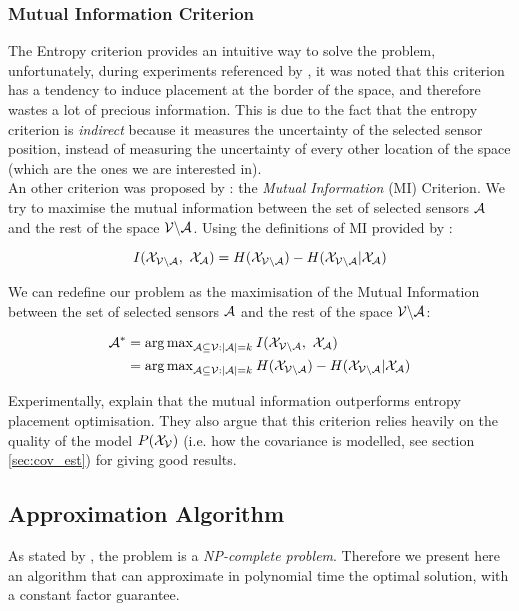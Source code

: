 \subsubsection{Mutual Information Criterion}

The Entropy criterion provides an intuitive way to solve the problem, unfortunately, during experiments referenced by \citet{krause_near-optimal_2008}, it was noted that this criterion has a tendency to induce placement at the border of the space, and therefore wastes a lot of precious information. This is due to the fact that the entropy criterion is \textit{indirect} because it measures the uncertainty of the selected sensor position, instead of measuring the uncertainty of every other location of the space (which are the ones we are interested in). \\

An other criterion was proposed by \citet{caselton_optimal_1984}: the \textit{Mutual Information} (MI) Criterion. We try to maximise the mutual information between the set of selected sensors $\mathcal{A}$ and the rest of the space $\mathcal{V} \backslash\mathcal{A}$. Using the definitions of MI provided by \citet[p.~19]{cover_elements_1991}: 

\begin{equation}
    I(\X_{\VA} , \X_\A) =  H(\X_{\VA}) -  H(\X_{\VA} | \X_{\A})
\end{equation}

We can redefine our problem as the maximisation of the Mutual Information between the set of selected sensors $\mathcal{A}$ and the rest of the space $\mathcal{V} \backslash\mathcal{A}$:

\begin{align}
    \A^* &= {\arg\max}_{\A \subseteq \V: |\A| = k } \: I(\X_{\VA} , \X_\A) \\
    &= {\arg\max}_{\A \subseteq \V: |\A| = k } \: H(\X_{\VA}) -  H(\X_{\VA} | \X_{\A})
\end{align}


Experimentally, \citet{krause_near-optimal_2008} explain that  the mutual information outperforms entropy placement optimisation. They also argue that this criterion relies heavily on the quality of the model $P(\mathcal{X}_{\mathcal{V}})$ (i.e. how the covariance is modelled, see section \ref{sec:cov_est}) for giving good results. 

\subsection{Approximation Algorithm}
 
 As stated by \citet{krause_near-optimal_2008}, the problem is a \textit{NP-complete problem}. Therefore we present here an algorithm that can approximate in polynomial time the optimal solution, with a constant factor guarantee. \\
 

